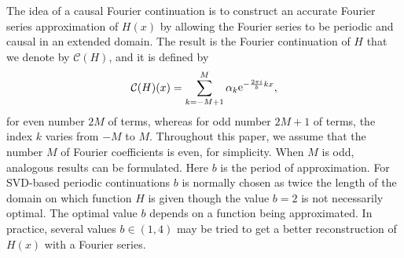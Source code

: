 \documentclass[journal,twoside]{IEEEtran}
\begin{document}
The idea of a causal Fourier continuation is to construct an accurate Fourier series approximation of $H(x)$ by allowing the Fourier series to be periodic and causal in an extended domain. The result is the Fourier continuation of $H$ that we denote by ${\mathcal C}(H)$, and it is defined by
\begin{equation}\label{E1}
{\mathcal C}(H)(x)=\sum_{k=-M+1}^{M} \alpha_k {\mathop{\rm e}\nolimits}^{-\frac{2\pi i}{b} k x},
\end{equation}
for even number $2M$ of terms, whereas for odd number $2M+1$ of terms, the index $k$ varies from $-M$ to $M$. 
Throughout this paper, we assume that the number $M$ of Fourier coefficients is even, for simplicity. When $M$ is odd, analogous results can be formulated.
Here $b$ is the period of approximation. For SVD-based periodic continuations $b$ is normally chosen as twice the length of the domain on which function $H$ is given though the value $b=2$ is not necessarily optimal. The optimal value $b$ depends on a function being approximated. In practice, several values $b\in(1,4)$ may be tried to get a better reconstruction of $H(x)$ with a Fourier series.
\end{document}
